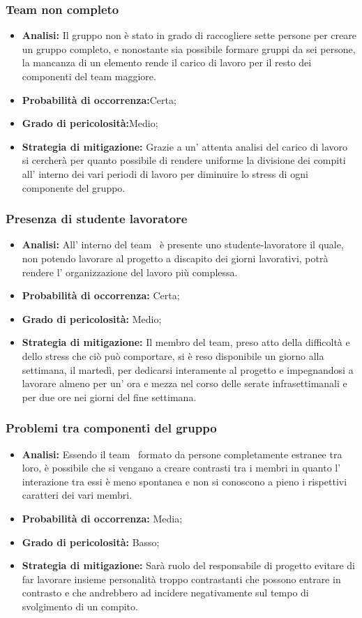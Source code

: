 \subsubsection{Team non completo}
	\begin{itemize}
	\item \textbf{Analisi: }Il gruppo non è stato in grado di raccogliere sette persone per creare un gruppo completo, e nonostante sia possibile formare gruppi da sei persone, la mancanza di un elemento rende il carico di lavoro per il resto dei componenti del team maggiore.
	\item \textbf{Probabilità di occorrenza:}Certa;
	\item \textbf{Grado di pericolosità:}Medio;
	\item \textbf{Strategia di mitigazione: }Grazie a un' attenta analisi del carico di lavoro si cercherà per quanto possibile di rendere uniforme la divisione dei compiti all' interno dei vari periodi di lavoro per diminuire lo stress di ogni componente del gruppo.
	\end{itemize}
\subsubsection{Presenza di studente lavoratore}
	\begin{itemize}
	\item \textbf{Analisi: }All' interno del team \gruppo ~è presente uno studente-lavoratore il quale, non potendo lavorare al progetto a discapito dei giorni lavorativi, potrà rendere l' organizzazione del lavoro più complessa.
	\item \textbf{Probabilità di occorrenza:} Certa;
	\item \textbf{Grado di pericolosità:} Medio;
	\item \textbf{Strategia di mitigazione: }Il membro del team, preso atto della difficoltà e dello stress che ciò può comportare, si è reso disponibile un giorno alla settimana, il martedì, per dedicarsi interamente al progetto e impegnandosi a lavorare almeno per un' ora e mezza nel corso delle serate infrasettimanali e per due ore nei giorni del fine settimana.	
	\end{itemize}
\subsubsection{Problemi tra componenti del gruppo}
	\begin{itemize}
	\item \textbf{Analisi: }Essendo il team \gruppo ~formato da persone completamente estranee tra loro, è possibile che si vengano a creare contrasti tra i membri in quanto l' interazione tra essi è meno spontanea e non si conoscono a pieno i rispettivi caratteri dei vari membri.
	\item \textbf{Probabilità di occorrenza:} Media;
	\item \textbf{Grado di pericolosità:} Basso;
	\item \textbf{Strategia di mitigazione: }Sarà ruolo del responsabile di progetto evitare di far lavorare insieme personalità troppo contrastanti che possono entrare in contrasto e che andrebbero ad incidere negativamente sul tempo di svolgimento di un compito.
	\end{itemize}
